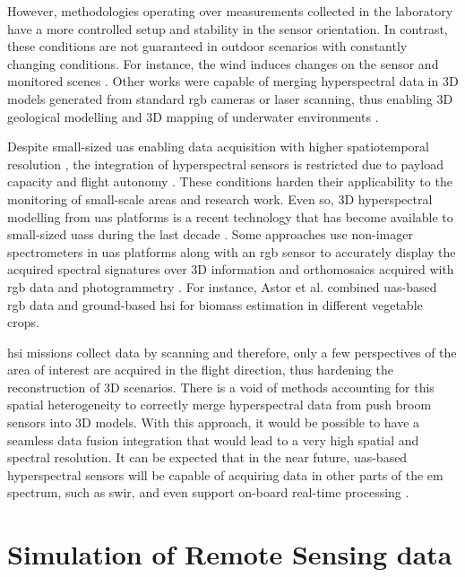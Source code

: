 However, methodologies operating over measurements collected in the laboratory have a more controlled setup and stability in the sensor orientation. In contrast, these conditions are not guaranteed in outdoor scenarios with constantly changing conditions. For instance, the wind induces changes on the sensor and monitored scenes \cite{kalisperakis_leaf_2015}. Other works were capable of merging hyperspectral data in 3D models generated from standard \acrshort{rgb} cameras or laser scanning, thus enabling 3D geological modelling \cite{nieto_3d_2010} and 3D mapping of underwater environments \cite{ferrera_hyperspectral_2021}. 

Despite small-sized \acrshort{uas} enabling data acquisition with higher spatiotemporal resolution \cite{padua_uas_2017}, the integration of hyperspectral sensors is restricted due to payload capacity and flight autonomy \cite{bruning_approaches_2020}. These conditions harden their applicability to the monitoring of small-scale areas and research work. Even so, 3D hyperspectral modelling from \acrshort{uas} platforms is a recent technology that has become available to small-sized \acrshort{uas}s during the last decade \cite{nevalainen_individual_2017}. Some approaches use non-imager spectrometers in \acrshort{uas} platforms along with an \acrshort{rgb} sensor to accurately display the acquired spectral signatures over 3D information and orthomosaics acquired with \acrshort{rgb} data and photogrammetry \cite{garzonio_surface_2017}. For instance, Astor et al. \cite{astor_vegetable_2020} combined \acrshort{uas}-based \acrshort{rgb} data and ground-based \acrshort{hsi} for biomass estimation in different vegetable crops.

\acrshort{hsi} missions collect data by scanning and therefore, only a few perspectives of the area of interest are acquired in the flight direction, thus hardening the reconstruction of 3D scenarios. There is a void of methods accounting for this spatial heterogeneity to correctly merge hyperspectral data from push broom sensors into 3D models. With this approach, it would be possible to have a seamless data fusion integration that would lead to a very high spatial and spectral resolution. It can be expected that in the near future, \acrshort{uas}-based hyperspectral sensors will be capable of acquiring data in other parts of the \acrshort{em} spectrum, such as \acrshort{swir}, and even support on-board real-time processing \cite{horstrand_uav_2019, saari_visible_2017}.

\section{Simulation of Remote Sensing data}

